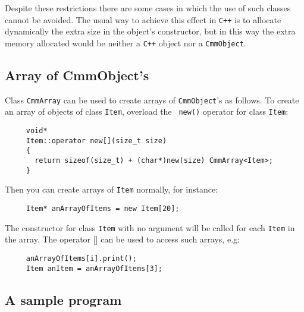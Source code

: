 Despite these restrictions there are some cases in which the use of such
classes cannot be avoided. The usual way to achieve this effect in {\tt C++}
is to allocate dynamically the extra size in the object's constructor, but in
this way the extra memory allocated would be neither a {\tt C++} object nor a
{\tt CmmObject}.

\subsection{Array of CmmObject's}

Class {\tt CmmArray} can be used to create arrays of {\tt CmmObject}'s as
follows.  To create an array of objects of class {\tt Item}, overload the {\tt
  new()} operator for class {\tt Item}:

\begin{verbatim}
     void*
     Item::operator new[](size_t size)
     {
       return sizeof(size_t) + (char*)new(size) CmmArray<Item>;
     }
\end{verbatim}

Then you can create arrays of {\tt Item} normally, for instance:

\begin{verbatim}
     Item* anArrayOfItems = new Item[20];
\end{verbatim}

The constructor for class {\tt Item} with no argument will be called for each
{\tt Item} in the array.  The operator [] can be used to access such arrays,
e.g:

\begin{verbatim}
     anArrayOfItems[i].print();
     Item anItem = anArrayOfItems[3];
\end{verbatim}

\subsection{A sample program}

